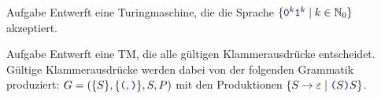 \begin{frame}{Aufgabe}
	Entwerft eine Turingmaschine, die die Sprache $ \{\hbox{\textcolor{blue}{\texttt{0}}}^k\hbox{\textcolor{blue}{\texttt{1}}}^k \mid k\in \mathbb{N}_0 \} $ akzeptiert.
\end{frame}

\begin{frame}{Aufgabe}
	Entwerft eine TM, die alle gültigen Klammerausdrücke entscheidet.\\
	\medskip
	Gültige Klammerausdrücke werden dabei von der folgenden Grammatik produziert: $ G = (\{S\},\{\hbox{\textcolor{blue}{\texttt{(}}}, \hbox{\textcolor{blue}{\texttt{)}}}\}, S, P )$ mit den Produktionen $\left\{ S \to \varepsilon \mid \hbox{\textcolor{blue}{\texttt{(}}}S\hbox{\textcolor{blue}{\texttt{)}}}S\right\}$.
\end{frame}
